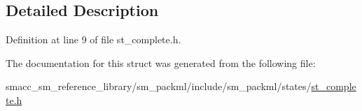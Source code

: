 \subsection{Detailed Description}


Definition at line 9 of file st\+\_\+complete.\+h.



The documentation for this struct was generated from the following file\+:\begin{DoxyCompactItemize}
\item 
smacc\+\_\+sm\+\_\+reference\+\_\+library/sm\+\_\+packml/include/sm\+\_\+packml/states/\hyperlink{st__complete_8h}{st\+\_\+complete.\+h}\end{DoxyCompactItemize}
